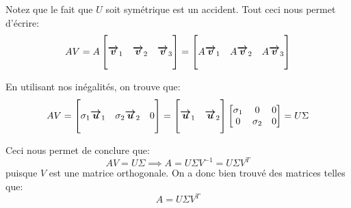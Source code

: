 \documentclass[a4paper]{article}
\begin{document}
{    Notez que le fait que $U$ soit symétrique est un accident. Tout ceci nous permet d'écrire: 
    \[A V = A \begin{bmatrix}  &  &  \\ \bm{\protect\overrightarrow{v}}_1 & \bm{\protect\overrightarrow{v}}_2 & \bm{\protect\overrightarrow{v}}_3 \\  &  &  \end{bmatrix} = \begin{bmatrix}  &  &  \\ A \bm{\protect\overrightarrow{v}}_1 & A \bm{\protect\overrightarrow{v}}_2 & A \bm{\protect\overrightarrow{v}}_3 \\  &  &  \end{bmatrix} \]

    En utilisant nos inégalités, on trouve que:
    \[AV = \begin{bmatrix}  &  &  \\ \sigma_1 \bm{\protect\overrightarrow{u}}_1 & \sigma_2 \bm{\protect\overrightarrow{u}}_2 & 0 \\  &  &  \end{bmatrix} = \begin{bmatrix}  &  \\ \bm{\protect\overrightarrow{u}}_1 & \bm{\protect\overrightarrow{u}}_2 \\  &  \end{bmatrix}  \begin{bmatrix} \sigma_1 & 0 & 0 \\ 0 & \sigma_2 & 0 \end{bmatrix} = U \Sigma \]
    
    Ceci nous permet de conclure que:
    \[AV = U \Sigma \implies A = U \Sigma V^{-1} = U \Sigma V^T\]
    puisque $V$ est une matrice orthogonale. On a donc bien trouvé des matrices telles que: 
    \[A = U \Sigma V^T\]
}
\end{document}
